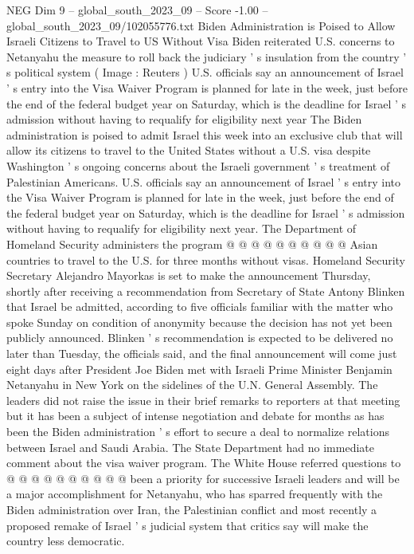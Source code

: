 \begin{textsample}{NEG Dim 9 – global\_south\_2023\_09 – Score -1.00 – global\_south\_2023\_09/102055776.txt}  \label{ex:f9_neg_025}
Biden Administration is Poised to Allow Israeli Citizens to Travel to US Without Visa Biden reiterated U.S. concerns to Netanyahu the measure to roll back the judiciary ' s insulation from the country ' s political system ( Image : Reuters ) U.S. officials say an announcement of Israel ' s entry into the Visa Waiver Program is planned for late in the week, just before the end of the federal budget year on Saturday, which is the deadline for Israel ' s admission without having to requalify for eligibility next year The Biden administration is poised to admit Israel this week into an exclusive club that will allow its citizens to travel to the United States without a U.S. visa despite Washington ' s ongoing concerns about the Israeli government ' s treatment of Palestinian Americans.
U.S. officials say an announcement of Israel ' s entry into the Visa Waiver Program is planned for late in the week, just before the end of the federal budget year on Saturday, which is the deadline for Israel ' s admission without having to requalify for eligibility next year.
The Department of Homeland Security administers the program @ @ @ @ @ @ @ @ @ @ Asian countries to travel to the U.S. for three months without visas.
Homeland Security Secretary Alejandro Mayorkas is set to make the announcement Thursday, shortly after receiving a recommendation from Secretary of State Antony Blinken that Israel be admitted, according to five officials familiar with the matter who spoke Sunday on condition of anonymity because the decision has not yet been publicly announced.
Blinken ' s recommendation is expected to be delivered no later than Tuesday, the officials said, and the final announcement will come just eight days after President Joe Biden met with Israeli Prime Minister Benjamin Netanyahu in New York on the sidelines of the U.N.
General Assembly.
The leaders did not raise the issue in their brief remarks to reporters at that meeting but it has been a subject of intense negotiation and debate for months as has been the Biden administration ' s effort to secure a deal to normalize relations between Israel and Saudi Arabia.
The State Department had no immediate comment about the visa waiver program.
The White House referred questions to @ @ @ @ @ @ @ @ @ @ been a priority for successive Israeli leaders and will be a major accomplishment for Netanyahu, who has sparred frequently with the Biden administration over Iran, the Palestinian conflict and most recently a proposed remake of Israel ' s judicial system that critics say will make the country less democratic.

\end{textsample}
